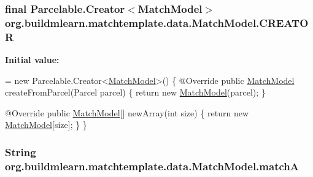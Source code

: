 \subsubsection[{\texorpdfstring{C\+R\+E\+A\+T\+OR}{CREATOR}}]{\setlength{\rightskip}{0pt plus 5cm}final Parcelable.\+Creator$<${\bf Match\+Model}$>$ org.\+buildmlearn.\+matchtemplate.\+data.\+Match\+Model.\+C\+R\+E\+A\+T\+OR\hspace{0.3cm}{\ttfamily [static]}}\hypertarget{classorg_1_1buildmlearn_1_1matchtemplate_1_1data_1_1MatchModel_aa72afb928570b756c70703b957c54ed1}{}\label{classorg_1_1buildmlearn_1_1matchtemplate_1_1data_1_1MatchModel_aa72afb928570b756c70703b957c54ed1}
{\bfseries Initial value\+:}
\begin{DoxyCode}
= \textcolor{keyword}{new} Parcelable.Creator<\hyperlink{classorg_1_1buildmlearn_1_1matchtemplate_1_1data_1_1MatchModel_a924aa9108269f905b49e1062c271a757}{MatchModel}>() \{
        @Override
        \textcolor{keyword}{public} \hyperlink{classorg_1_1buildmlearn_1_1matchtemplate_1_1data_1_1MatchModel_a924aa9108269f905b49e1062c271a757}{MatchModel} createFromParcel(Parcel parcel) \{
            \textcolor{keywordflow}{return} \textcolor{keyword}{new} \hyperlink{classorg_1_1buildmlearn_1_1matchtemplate_1_1data_1_1MatchModel_a924aa9108269f905b49e1062c271a757}{MatchModel}(parcel);
        \}

        @Override
        \textcolor{keyword}{public} \hyperlink{classorg_1_1buildmlearn_1_1matchtemplate_1_1data_1_1MatchModel_a924aa9108269f905b49e1062c271a757}{MatchModel}[] newArray(\textcolor{keywordtype}{int} size) \{
            \textcolor{keywordflow}{return} \textcolor{keyword}{new} \hyperlink{classorg_1_1buildmlearn_1_1matchtemplate_1_1data_1_1MatchModel_a924aa9108269f905b49e1062c271a757}{MatchModel}[size];
        \}
    \}
\end{DoxyCode}
\subsubsection[{\texorpdfstring{matchA}{matchA}}]{\setlength{\rightskip}{0pt plus 5cm}String org.\+buildmlearn.\+matchtemplate.\+data.\+Match\+Model.\+matchA\hspace{0.3cm}{\ttfamily [private]}}\hypertarget{classorg_1_1buildmlearn_1_1matchtemplate_1_1data_1_1MatchModel_afa38921fe539b779c21cc5247d1386c1}{}\label{classorg_1_1buildmlearn_1_1matchtemplate_1_1data_1_1MatchModel_afa38921fe539b779c21cc5247d1386c1}
